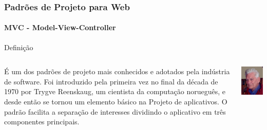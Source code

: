 \documentclass[
	9pt, %
	t, %
]{beamer}
\begin{document}
\begin{frame}
	\frametitle{Padrões de Projeto para Web}
	\framesubtitle{MVC - Model-View-Controller}

	\begin{block}{Definição}
	\begin{columns}[c] %
			\begin{column}{0.8\textwidth} %
				É um dos padrões de projeto mais conhecidos e adotados pela indústria de software. Foi introduzido pela primeira vez no final da década de 1970 por Trygve Reenskaug, um cientista da computação norueguês, e desde então se tornou um elemento básico na Projeto de aplicativos. O padrão facilita a separação de interesses dividindo o aplicativo em três componentes principais.
			\end{column}

			\begin{column}{0.2\textwidth} %
				\includegraphics[width=0.9\linewidth]{Images/reenskaug.jpg}
			\end{column}
		\end{columns}
	\end{block}

\end{frame}
\end{document}
